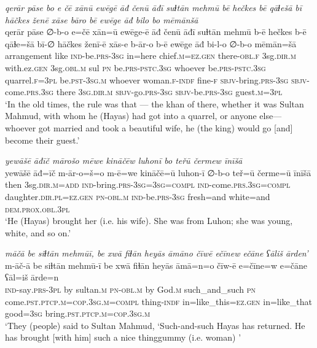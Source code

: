 \ea \label{ŽH.64}
\textit{qerār pāse bo e čē xānū ewēgē āđ čenū āđī suɫtān mehmū bē hečkes bē qāɫešā bī hāčkes ženē xāse bāro bē ewēge āđ bilo bo mēmānšā} \\ 
\gll qerār pāse ∅-b-o e=čē xān=ū ewēge-ē āđ čenū āđī suɫtān mehmū b-ē hečkes b-ē qāɫe=šā bī-∅ hāčkes ženī-ē xās-e b-ār-o b-ē ewēge āđ bi-l-o ∅-b-o mēmān=šā \\ 
 arrangement like \textsc{ind-}be\textsc{.prs}\textsc{-3sg} in=here chief\textsc{.m}\textsc{=ez}\textsc{.gen} there\textsc{-obl}\textsc{\textsc{.f}} 3sg\textsc{.dir}\textsc{.m} with.ez\textsc{.gen} 3sg\textsc{.obl}\textsc{.m} sul \textsc{pn} be\textsc{.prs}\textsc{-pstc}\textsc{.3sg} whoever be\textsc{.prs}\textsc{-pstc}\textsc{.3sg} quarrel\textsc{\textsc{.f}}\textsc{=3pl} be\textsc{.pst}\textsc{-3sg}\textsc{.m} whoever woman\textsc{\textsc{.f}}\textsc{-indf} fine\textsc{-f} \textsc{sbjv-}bring\textsc{.prs}\textsc{-3sg} \textsc{sbjv-}come\textsc{.prs}\textsc{.3sg} there \textsc{3sg}\textsc{.dir}\textsc{.m} \textsc{sbjv-}go\textsc{.prs}\textsc{-3sg} \textsc{sbjv-}be\textsc{.prs}\textsc{-3sg} guest\textsc{.m}\textsc{=3pl} \\ 
\glt `In the old times, the rule was that — the khan of there, whether it was Sultan Mahmud, with whom he (Hayas) had got into a quarrel, or anyone else— whoever got married and took a beautiful wife, he (the king) would go [and] become their guest.'
\z 
 
\ea \label{ŽH.65}
\textit{yewāšē āđīč mārošo mēwe kināčēw luhonī bo teřū čermew īnīšā} \\ 
\gll yewāšē āđ=īč m-ār-o=š=o m-ē=we kināčē=ū luhon-ī ∅-b-o teř=ū čerme=ū īnīšā \\ 
 then 3sg\textsc{.dir}\textsc{.m}\textsc{=add} \textsc{ind-}bring\textsc{.prs}\textsc{-3sg}\textsc{=3sg}\textsc{=compl} \textsc{ind-}come\textsc{.prs}\textsc{.3sg}\textsc{=compl} daughter\textsc{.dir}\textsc{.pl}\textsc{=ez}\textsc{.gen} \textsc{pn}\textsc{-obl}\textsc{.m} \textsc{ind-}be\textsc{.prs}\textsc{-3sg} fresh=and white=and \textsc{dem.prox}\textsc{.obl}\textsc{.3pl} \\ 
\glt `He (Hayas) brought her (i.e. his wife). She was from Luhon; she was young, white, and so on.'
\z 
 
\ea \label{ŽH.66}
\textit{māčā be siɫtān mehmūī, be xwā fiɫān heyās āmāno čīwē ečīnew ečāne ʕāliš ārden’} \\ 
\gll m-āč-ā be siɫtān mehmū-ī be xwā fiɫān heyās āmā=n=o čīw-ē e=čīne=w e=čāne ʕāl=iš ārde=n \\ 
 \textsc{ind-}say\textsc{.prs}\textsc{-3pl} by sultan\textsc{.m} \textsc{pn}\textsc{-obl}\textsc{.m} by God\textsc{.m} such\_and\_such \textsc{pn} come\textsc{.pst}\textsc{.ptcp}\textsc{.m}\textsc{=cop}\textsc{.3sg}\textsc{.m}\textsc{=compl} thing\textsc{-indf} in=like\_this\textsc{=ez}\textsc{.gen} in=like\_that good\textsc{=3sg} bring\textsc{.pst}\textsc{.ptcp}\textsc{.m}\textsc{=cop}\textsc{.3sg}\textsc{.m} \\ 
\glt `They (people) said to Sultan Mahmud, ‘Such-and-such Hayas has returned. He has brought [with him] such a nice thinggummy (i.e. woman)  '
\z 
 
